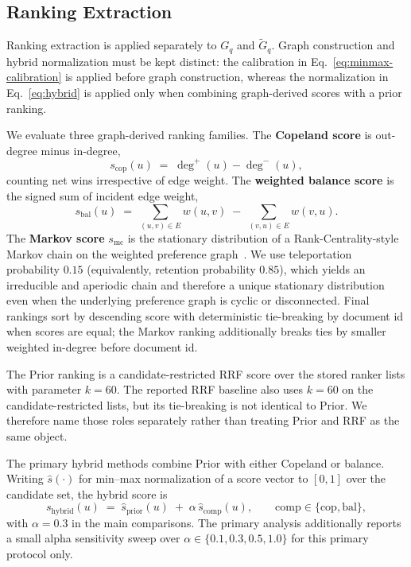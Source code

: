 \documentclass[manuscript,anonymous,review]{acmart}
\begin{document}
\subsection{Ranking Extraction}
\label{sec:extraction}

Ranking extraction is applied separately to $G_q$ and $\widetilde G_q$. Graph
construction and hybrid normalization must be kept distinct: the calibration
in Eq.~\eqref{eq:minmax-calibration} is applied before graph construction,
whereas the normalization in Eq.~\eqref{eq:hybrid} is applied only when
combining graph-derived scores with a prior ranking.

We evaluate three graph-derived ranking families. The \textbf{Copeland score}
is out-degree minus in-degree,
\begin{equation}
  s_{\mathrm{cop}}(u) \;=\; \deg^+(u) - \deg^-(u),
  \label{eq:copeland}
\end{equation}
counting net wins irrespective of edge weight. The \textbf{weighted balance
score} is the signed sum of incident edge weight,
\begin{equation}
  s_{\mathrm{bal}}(u) \;=\; \sum_{(u,v)\in E} w(u,v) \;-\; \sum_{(v,u)\in E} w(v,u).
  \label{eq:balance}
\end{equation}
The \textbf{Markov score} $s_{\mathrm{mc}}$ is the stationary distribution of
a Rank-Centrality-style Markov chain on the weighted preference
graph~\cite{negahban2017rankcentrality}. We use teleportation probability
$0.15$ (equivalently, retention probability $0.85$), which yields an
irreducible and aperiodic chain and therefore a unique stationary distribution
even when the underlying preference graph is cyclic or disconnected. Final
rankings sort by descending score with deterministic tie-breaking by document
id when scores are equal; the Markov ranking additionally breaks ties by
smaller weighted in-degree before document id.

The Prior ranking is a candidate-restricted RRF score over the stored ranker
lists with parameter $k=60$. The reported RRF baseline also uses $k=60$ on the
candidate-restricted lists, but its tie-breaking is not identical to Prior.
We therefore name those roles separately rather than treating Prior and RRF as
the same object.

The primary hybrid methods combine Prior with either Copeland or balance.
Writing $\hat{s}(\cdot)$ for min--max normalization of a score vector to
$[0,1]$ over the candidate set, the hybrid score is
\begin{equation}
  s_{\mathrm{hybrid}}(u) \;=\; \hat{s}_{\mathrm{prior}}(u) \;+\; \alpha\, \hat{s}_{\mathrm{comp}}(u),
  \qquad \mathrm{comp} \in \{\mathrm{cop}, \mathrm{bal}\},
  \label{eq:hybrid}
\end{equation}
with $\alpha=0.3$ in the main comparisons. The primary analysis additionally
reports a small alpha sensitivity sweep over $\alpha \in \{0.1,0.3,0.5,1.0\}$
for this primary protocol only.
\end{document}

